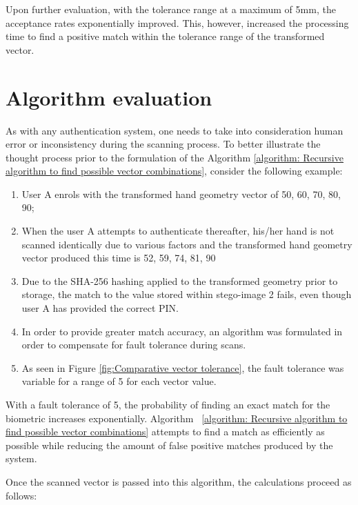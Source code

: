 Upon further evaluation, with the tolerance range at a maximum of 5mm, the acceptance rates exponentially improved. This, however, increased the processing time to find a positive match within the tolerance range of the transformed vector. 

\section{Algorithm evaluation}

As with any authentication system, one needs to take into consideration human error or inconsistency during the scanning process. To better illustrate the thought process prior to the formulation of the Algorithm \ref{algorithm: Recursive algorithm to find possible vector combinations}, consider the following example:

\begin{enumerate}[label=\roman*.]
    \item User A enrols with the transformed hand geometry vector of {50, 60, 70, 80, 90};
    \item When the user A attempts to authenticate thereafter, his/her hand is not scanned identically due to various factors and the transformed hand geometry vector produced this time is {52, 59, 74, 81, 90}
    \item Due to the SHA-256 hashing applied to the transformed geometry prior to storage, the match to the value stored within stego-image 2 fails, even though user A has provided the correct PIN.
    \item In order to provide greater match accuracy, an algorithm was formulated in order to compensate for fault tolerance during scans.
    \item As seen in Figure \ref{fig:Comparative vector tolerance}, the fault tolerance was variable for a range of 5 for each vector value.
\end{enumerate}

With a fault tolerance of 5, the probability of finding an exact match for the biometric increases exponentially. Algorithm ~\ref{algorithm: Recursive algorithm to find possible vector combinations} attempts to find a match as efficiently as possible while reducing the amount of false positive matches produced by the system.

Once the scanned vector is passed into this algorithm, the calculations proceed as follows:

